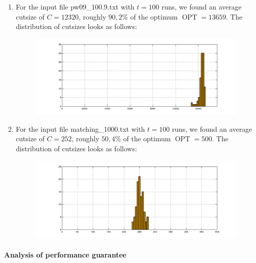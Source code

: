 \documentclass{tufte-handout}
\begin{document}
\begin{enumerate}
\item
For the input file  pw09\_100.9.txt with $t=100$ runs, we found
an average cutsize of $C=12320$, roughly $90,2$\% of the optimum
$\operatorname{OPT} = 13659$.
The distribution of cutsizes looks as follows:

\begin{center}

\begin{figure}
\includegraphics[scale=0.5]{hist.png}
\end{figure}

\end{center}
\medskip


\item
For the input file matching\_1000.txt with $t = 100$ runs, we found an average cutsize of $C = 252$, roughly $50,4$\% of the optimum $\operatorname{OPT} = 500$. The distribution of cutsizes looks as follows:

\begin{center}

\begin{figure}
\includegraphics[scale=0.5]{hist2.png}
\end{figure}

\end{center}


\end{enumerate}
\paragraph{Analysis of performance guarantee}
\end{document}
